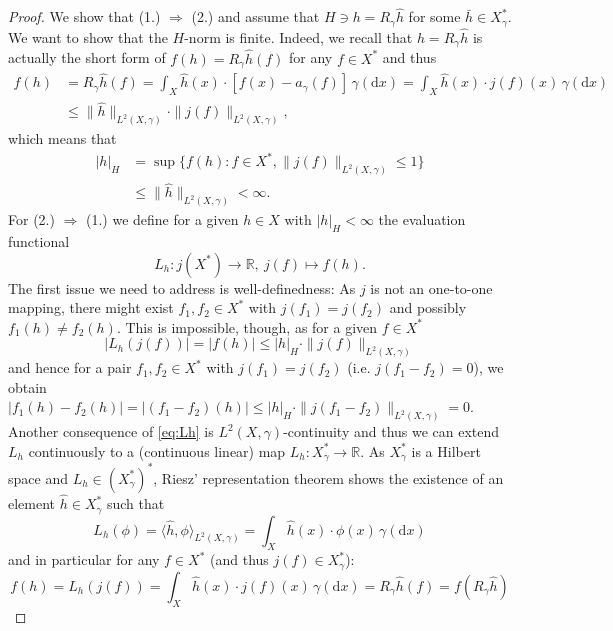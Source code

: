 \documentclass{scrartcl}
\theoremstyle{definition}
\theoremstyle{remark}
\newcommand{\de}{\mathrm d}
\newcommand{\R}{\mathbb R}
\begin{document}
\begin{proof}
We show that (1.) $\Rightarrow$ (2.) and assume that $H\ni h = R_\gamma \hat h$ for some $\bar h\in X_\gamma^*$. We want to show that the $H$-norm is finite. Indeed, we recall that $h = R_\gamma \hat h$ is actually the short form of $f(h) = R_\gamma \hat h (f)$ for any $f\in X^*$ and thus
\begin{align*}
f(h) &= R_\gamma \hat h (f) = \int_X \hat h(x) \cdot [f(x)-a_\gamma(f)]\, \gamma(\de x) = \int_X \hat h(x) \cdot j(f)(x)\, \gamma(\de x)\\
&\leq \|\hat h\|_{L^2(X,\gamma)}\cdot \|j(f)\|_{L^2(X,\gamma)},
\end{align*}
which means that 
\begin{align*}
|h|_H &= \sup\{f(h): f\in X^*, \|j(f)\|_{L^2(X, \gamma)} \leq 1 \}\\
&\leq \|\hat h\|_{L^2(X,\gamma)} < \infty.
\end{align*}
For (2.) $\Rightarrow$ (1.) we define for a given $h\in X$ with $|h|_H < \infty$ the evaluation functional
\[ L_h: j(X^*) \to \R,~ j(f) \mapsto f(h). \]
The first issue we need to address is well-definedness: As $j$ is not an one-to-one mapping, there might exist $f_1, f_2\in X^*$ with $j(f_1) = j(f_2)$ and possibly $f_1(h) \neq f_2(h)$. This is impossible, though, as for a given $f\in X^*$
\begin{equation}\label{eq:Lh}
|L_h(j(f))| = |f(h)| \leq |h|_H \cdot \|j(f)\|_{L^2(X,\gamma)}
\end{equation}
and hence for a pair $f_1,f_2\in X^*$ with $j(f_1) = j(f_2)$ (i.e. $j(f_1-f_2) = 0$), we obtain $|f_1(h)-f_2(h)| = |(f_1-f_2)(h)| \leq |h|_H \cdot \|j(f_1-f_2)\|_{L^2(X,\gamma)} = 0$.
Another consequence of \eqref{eq:Lh} is $L^2(X,\gamma)$-continuity and thus we can extend $L_h$ continuously to a (continuous linear) map $L_h: X_\gamma^*\to \R$. As $X_\gamma^*$ is a Hilbert space and $L_h \in (X_\gamma^*)^*$, Riesz' representation theorem shows the existence of an element $\hat h\in X_\gamma^*$ such that 
\begin{equation}\label{eq:reconLhrep}
L_h(\phi) = \langle \hat h, \phi\rangle_{L^2(X,\gamma)} = \int_X \hat h(x)\cdot \phi(x)\,\gamma(\de x)
\end{equation} 
and in particular for any $f\in X^*$ (and thus $j(f)\in X_\gamma^*$):
\begin{equation}\label{eq:reconLh}
f(h) = L_h(j(f)) = \int_X \hat h(x)\cdot j(f)(x)\,\gamma(\de x) = R_\gamma \hat h(f) = f(R_\gamma \hat h) 
\end{equation}


\end{proof}
\end{document}
